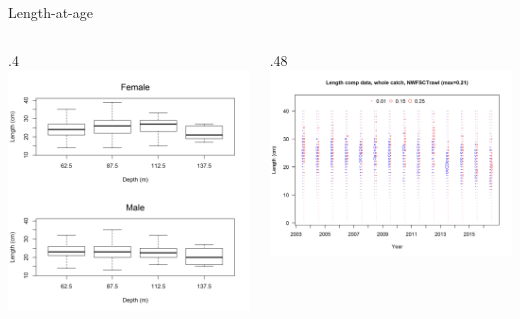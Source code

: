 \documentclass[ignorenonframetext,]{beamer}
\def\begincols{\begin{columns}}
\def\begincol{\begin{column}}
\def\endcol{\end{column}}
\def\endcols{\end{columns}}
\begin{document}
\begin{frame}{Length-at-age}

\begincols
 \begincol{.4\textwidth}
\includegraphics{Figures/NWFSCtrawl_lengthdepth.png} \endcol
\begincol{.48\textwidth}
\includegraphics{r4ss/plots_mod1/comp_lendat_bubflt8mkt0.png} \endcol
\endcols

\end{frame}
\end{document}
